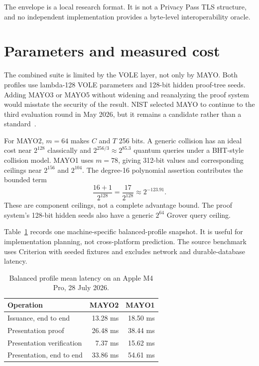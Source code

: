 \documentclass[11pt]{article}
\theoremstyle{remark}
\begin{document}
The envelope is a local research format. It is not a Privacy Pass TLS
structure, and no independent implementation provides a byte-level
interoperability oracle.

\section{Parameters and measured cost}

The combined suite is limited by the VOLE layer, not only by MAYO. Both
profiles use lambda-128 VOLE parameters and 128-bit hidden proof-tree seeds.
Adding MAYO3 or MAYO5 without widening and reanalyzing the proof system would
misstate the security of the result. NIST selected MAYO to continue to the
third evaluation round in May 2026, but it remains a candidate rather than a
standard~\cite{nist-ir-8610}.

For MAYO2, $m=64$ makes $C$ and $T$ 256 bits. A generic collision has an
ideal cost near $2^{128}$ classically and $2^{256/3}\approx 2^{85.3}$
quantum queries under a BHT-style collision model. MAYO1 uses $m=78$, giving
312-bit values and corresponding ceilings near $2^{156}$ and $2^{104}$.
The degree-16 polynomial assertion contributes the bounded term
\[
  \frac{16+1}{2^{128}} = \frac{17}{2^{128}} \approx 2^{-123.91}.
\]
These are component ceilings, not a complete advantage bound. The proof
system's 128-bit hidden seeds also have a generic $2^{64}$ Grover query
ceiling.

Table~\ref{tab:bench} records one machine-specific balanced-profile snapshot.
It is useful for implementation planning, not cross-platform prediction.
The source benchmark uses Criterion with seeded fixtures and excludes network
and durable-database latency.

\begin{table}[H]
  \centering
  \caption{Balanced profile mean latency on an Apple M4 Pro, 28 July 2026.}
  \label{tab:bench}
  \begin{tabular}{lrr}
    \toprule
    Operation & MAYO2 & MAYO1 \\
    \midrule
    Issuance, end to end & 13.28 ms & 18.50 ms \\
    Presentation proof & 26.48 ms & 38.44 ms \\
    Presentation verification & 7.37 ms & 15.62 ms \\
    Presentation, end to end & 33.86 ms & 54.61 ms \\
    \bottomrule
  \end{tabular}
\end{table}
\end{document}
